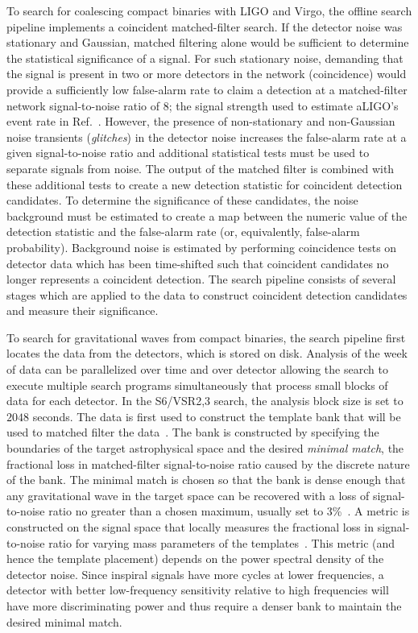 To search for coalescing compact binaries with LIGO and Virgo, the offline search
pipeline implements a coincident matched-filter search.  If the detector noise
was stationary and Gaussian, matched filtering alone would be sufficient to
determine the statistical significance of a signal. For such stationary noise, 
demanding that the signal is present in two or more detectors in the network 
(coincidence) would provide a sufficiently low false-alarm rate to claim a 
detection at a matched-filter network signal-to-noise ratio of 8; the signal 
strength used to estimate aLIGO's event rate in Ref.~\cite{Abadie:2010cf}.
However, the presence of non-stationary and non-Gaussian noise
transients (\emph{glitches})
in the detector noise increases the false-alarm rate at a given
signal-to-noise ratio and additional statistical tests must be used to separate
signals from noise. The output of the matched filter is combined with these
additional tests to create a new detection statistic for coincident detection
candidates. To determine the significance of these candidates, the noise
background must be estimated to create a map between the numeric value of the
detection statistic and the false-alarm rate (or, equivalently, false-alarm
probability). Background noise is estimated by performing coincidence tests on
detector data which has been time-shifted such that coincident candidates no
longer represents a coincident detection. The search pipeline consists of
several stages which are applied to the data to construct coincident detection
candidates and measure their significance. 

To search for gravitational waves from compact binaries, the search pipeline
first locates the data from the detectors, which is stored on disk. Analysis
of the week of data can be parallelized over time and over detector allowing
the search to execute multiple search programs simultaneously that process
small blocks of data for each detector. In the S6/VSR2,3 search, the 
analysis block size is set to $2048$ seconds.
The data is first used to construct the
template bank that will be used to matched filter the
data~\cite{Sathyaprakash:1991mt,Dhurandhar:1992mw,Owen:1995tm,Owen:1998dk,Babak:2006ty}.
The bank is constructed by specifying the boundaries of the target
astrophysical space and the desired \emph{minimal match}, the fractional loss in
matched-filter signal-to-noise ratio caused by the discrete nature of the bank.
The minimal match is chosen so that the bank is dense enough that any
gravitational wave in the target space can be recovered with a loss of
signal-to-noise ratio no greater than a chosen maximum, usually set to 3\%~\cite{Abbott:2011ys}. 
A metric is constructed on the signal space that
locally measures the fractional loss in signal-to-noise ratio for varying mass
parameters of the templates~\cite{Owen:1998dk}.  This metric (and hence
the template placement) depends on the power spectral density of the
detector noise. Since inspiral signals have more cycles at lower frequencies,
a detector with better low-frequency sensitivity relative to high frequencies
will have more discriminating power and thus require a denser bank to maintain
the desired minimal match.


